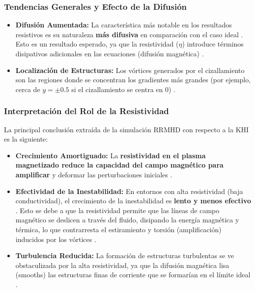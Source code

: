 \subsubsection{Tendencias Generales y Efecto de la Difusión}
\begin{itemize}
    \item \textbf{Difusión Aumentada:} La característica más notable en los resultados resistivos es su naturaleza \textbf{más difusiva} en comparación con el caso ideal \cite{349, 351}. Esto es un resultado esperado, ya que la resistividad ($\eta$) introduce términos disipativos adicionales en las ecuaciones (difusión magnética) \cite{349}.
    \item \textbf{Localización de Estructuras:} Los vórtices generados por el cizallamiento son las regiones donde se concentran los gradientes más grandes (por ejemplo, cerca de $y = \pm 0.5$ si el cizallamiento se centra en 0) \cite{348}.
\end{itemize}

\subsubsection{Interpretación del Rol de la Resistividad}

La principal conclusión extraída de la simulación RRMHD con respecto a la KHI es la siguiente:

\begin{itemize}
    \item \textbf{Crecimiento Amortiguado:} La \textbf{resistividad en el plasma magnetizado reduce la capacidad del campo magnético para amplificar} y deformar las perturbaciones iniciales \cite{393}.
    \item \textbf{Efectividad de la Inestabilidad:} En entornos con alta resistividad (baja conductividad), el crecimiento de la inestabilidad es \textbf{lento y menos efectivo} \cite{393}. Esto se debe a que la resistividad permite que las líneas de campo magnético se deslicen a través del fluido, disipando la energía magnética y térmica, lo que contrarresta el estiramiento y torsión (amplificación) inducidos por los vórtices \cite{365}.
    \item \textbf{Turbulencia Reducida:} La formación de estructuras turbulentas se ve obstaculizada por la alta resistividad, ya que la difusión magnética lisa (smooths) las estructuras finas de corriente que se formarían en el límite ideal \cite{393, 328}.
\end{itemize}

